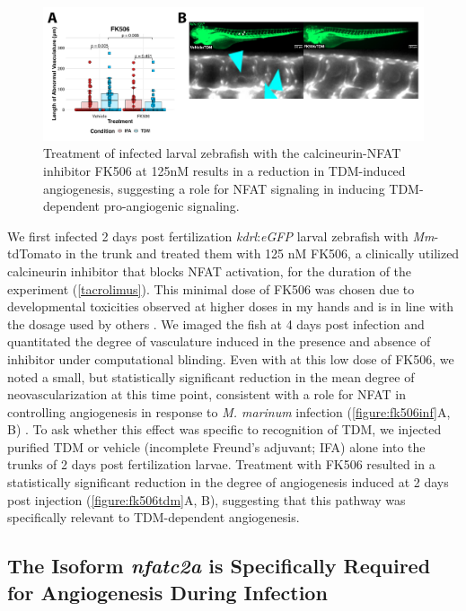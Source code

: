 \begin{figure}
\centering
\includegraphics[width=\textwidth]{images/fk506tdm.pdf}
\caption{Treatment of infected larval zebrafish with the calcineurin\hyp{}NFAT inhibitor FK506 at 125nM results in a reduction in TDM\hyp{}induced angiogenesis, suggesting a role for NFAT signaling in inducing TDM\hyp{}dependent pro\hyp{}angiogenic signaling.}
\label{figure:fk506tdm}
\end{figure}

We first infected 2 days post fertilization \textit{kdrl}:\textit{eGFP} larval zebrafish with \textit{Mm}\hyp{}tdTomato in the trunk and treated them with 125 nM FK506, a clinically utilized calcineurin inhibitor that blocks NFAT activation, for the duration of the experiment \citep{Ellis1995} (\autoref{tacrolimus}). This minimal dose of FK506 was chosen due to developmental toxicities observed at higher doses in my hands and is in line with the dosage used by others \citep{Kujawski2014}. We imaged the fish at 4 days post infection and quantitated the degree of vasculature induced in the presence and absence of inhibitor under computational blinding. Even with at this low dose of FK506, we noted a small, but statistically significant reduction in the mean degree of neovascularization at this time point, consistent with a role for NFAT in controlling angiogenesis in response to \textit{M. marinum} infection (\autoref{figure:fk506inf}A, B) \citep{Kujawski2014}. To ask whether this effect was specific to recognition of TDM, we injected purified TDM or vehicle (incomplete Freund's adjuvant; IFA) alone into the trunks of 2 days post fertilization larvae. Treatment with FK506 resulted in a statistically significant reduction in the degree of angiogenesis induced at 2 days post injection (\autoref{figure:fk506tdm}A, B), suggesting that this pathway was specifically relevant to TDM\hyp{}dependent angiogenesis.

\subsection{The Isoform \textit{nfatc2a} is Specifically Required for Angiogenesis During Infection}

